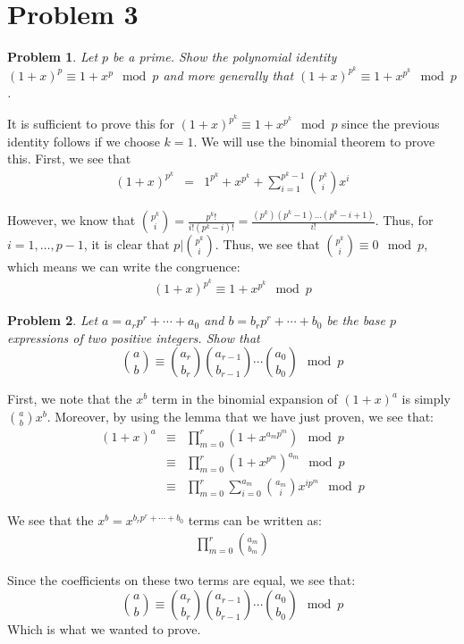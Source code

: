 \documentclass[psamsfonts]{amsart}
\newtheorem{prob}{Problem}[section]
\newenvironment{sol}{{\bfseries Solution}}{\qedsymbol}
\theoremstyle{definition}
\theoremstyle{remark}
\numberwithin{equation}{section}
\begin{document}
\section{Problem 3}

\begin{prob}
Let $p$ be a prime. Show the polynomial identity $(1+x)^p \equiv 1 + x^p \mod p$ and more generally that $(1+x)^{p^k} \equiv 1 + x^{p^k} \mod p$. 
\end{prob}

\begin{sol}
It is sufficient to prove this for $(1+x)^{p^k} \equiv 1 + x^{p^k} \mod p$ since the previous identity follows if we choose $k = 1$. We will use the binomial theorem to prove this. First, we see that 
\begin{eqnarray}
(1 + x)^{p^k} &=& 1^{p^k} + x^{p^k} + \sum_{i=1}^{p^k - 1} {p^k \choose i} x^i 
\end{eqnarray}

However, we know that ${ p^k \choose i} = \frac{p^k !}{i! ( p^k - i)!} = \frac{ (p^k)(p^k - 1) \ldots (p^k - i + 1)}{i!}$. Thus, for $i = 1, \ldots, p-1$, it is clear that $p | {p^k \choose i}$. Thus, we see that ${p^k \choose i} \equiv 0 \mod p$, which means we can write the congruence:
\begin{eqnarray}
(1+x)^{p^k} \equiv 1 + x^{p^k} \mod p
\end{eqnarray}
\end{sol}

\begin{prob}
Let $a = a_r p^r + \cdots + a_0$ and $b = b_r p^r + \cdots + b_0$ be the base $p$ expressions of two positive integers. Show that 
\begin{equation}
{a \choose b} \equiv {a_r \choose b_r} {a_{r - 1} \choose b_{r-1} } \cdots { a_0 \choose b_0} \mod p
\end{equation}
\end{prob}

\begin{sol}
First, we note that the $x^b$ term in the binomial expansion of $(1+x)^a$ is simply ${a \choose b} x^b$. Moreover, by using the lemma that we have just proven, we see that:
\begin{eqnarray}
(1 + x)^a &\equiv& \prod_{m=0}^r ( 1 + x^{a_m p^m}) \mod p \\
&\equiv& \prod_{m=0}^r (1 + x^{p^m})^{a_m} \mod p \\
&\equiv& \prod_{m=0}^r \sum_{i = 0}^{a_m} {a_m \choose i} x^{i p^m} \mod p
\end{eqnarray} 

We see that the $x^b = x^{b_r p^r + \cdots + b_0}$ terms can be written as:
\begin{eqnarray}
\prod_{m=0}^r {a_m \choose b_m}
\end{eqnarray}

Since the coefficients on these two terms are equal, we see that:
\begin{equation}
{a \choose b} \equiv {a_r \choose b_r} {a_{r - 1} \choose b_{r-1} } \cdots { a_0 \choose b_0} \mod p
\end{equation}
Which is what we wanted to prove.
\end{sol}
\end{document}
